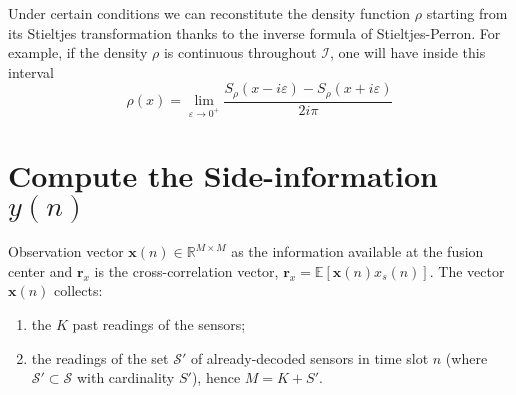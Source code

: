 Under certain conditions we can reconstitute the density function $\rho$ starting from its Stieltjes transformation thanks to the inverse formula of Stieltjes-Perron. For example, if the density $\rho$ is continuous throughout $\mathcal{I}$, one will have inside this interval
\begin{equation}
    \rho(x) = \lim_{\varepsilon \rightarrow 0^{+}} \dfrac{S_{\rho}(x-i\varepsilon) - S_{\rho}(x+i\varepsilon)}{2i\pi}
    \label{eq-Stieltjesinverse}
\end{equation}




\section{Compute the Side-information $y(n)$}
Observation vector $\mathbf{x}(n) \in \mathbb{R}^{M\times M}$ as the information available at the fusion center and $\mathbf{r}_x$ is the cross-correlation vector, $\mathbf{r}_x = \mathbb{E}[\mathbf{x}(n)x_s(n)]$. The vector $\mathbf{x}(n)$ collects: 
\begin{enumerate}
    \item the $K$ past readings of the sensors;
    \item the readings of the set $\mathcal{S}'$ of already-decoded sensors in time slot $n$ (where $\mathcal{S}' \subset \mathcal{S}$ with cardinality $S'$), hence $M = K+S'$. 
\end{enumerate}
